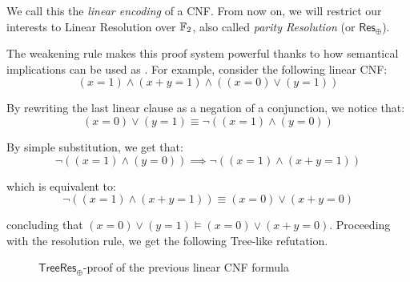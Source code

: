 We call this the \textit{linear encoding} of a CNF. From now on, we will restrict our interests to Linear Resolution over $\mathbb{F}_2$, also called \textit{parity Resolution} (or $\mathsf{Res}_\oplus$).

The weakening rule makes this proof system powerful thanks to how semantical implications can be used as . For example, consider the following linear CNF:
\[(x = 1) \land (x+y = 1) \land ((x = 0) \lor (y = 1))\]

\noindent
By rewriting the last linear clause as a negation of a conjunction, we notice that:
\[(x = 0) \lor (y = 1) \equiv \lnot ((x = 1) \land (y = 0))\]

\noindent
By simple substitution, we get that:
\[\lnot ((x = 1) \land (y = 0)) \implies  \lnot ((x = 1) \land (x+y = 1))\]

\noindent
which is equivalent to:
\[\lnot ((x = 1) \land (x+y = 1)) \equiv (x = 0) \lor (x+y = 0)\]

\noindent
concluding that $(x = 0) \lor (y = 1) \models (x = 0) \lor (x+y = 0)$. Proceeding with the resolution rule, we get the following Tree-like refutation.
\begin{figure}[H]
    \centering
    

    \caption{$\mathsf{TreeRes}_\oplus$-proof of the previous linear CNF formula}
    \label{treelike_proof}
\end{figure}

